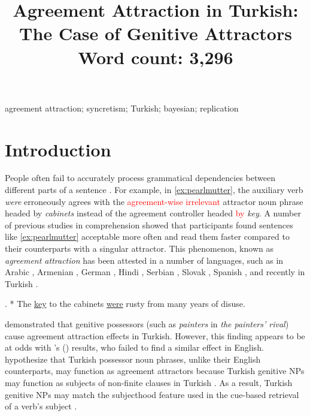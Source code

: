 \documentclass[apacite,linguex]{glossa}\usepackage[]{graphicx}\usepackage[]{color}
\title[Agreement Attraction in Turkish]{Agreement Attraction in Turkish: The Case of Genitive Attractors\\ \bigskip \large Word count: 3,296}
\author[\firstauthor \& \secondauthor]%
{%
  \spauthor{\texttt{Hidden Hidden (\firstauthor)}\\ 
  \institute{\texttt{Hidden University}}\\
  \small{
    \texttt{hidden@hidden.edu}}
  }
  \AND
  \spauthor{\texttt{Hidden Hidden (\secondauthor)}\\ 
  \institute{\texttt{Hidden University}}\\
  \small{
    \texttt{hidden@hidden.edu}}
  }%
}
\newcommand{\revise}[1]{\textcolor{red}{#1}}
\begin{document}
\sffamily
\maketitle


\begin{abstract}




\end{abstract}

\begin{keywords}
agreement attraction; syncretism; Turkish; bayesian; replication
\end{keywords}

\rmfamily



\section{Introduction}

People often fail to accurately process grammatical dependencies between different parts of a sentence \citep[e.g.,][]{GibsonThomas:1999,PhillipsEtAl:2011}. For example, in \ref{ex:pearlmutter}, the auxiliary verb \textit{were} erroneously agrees with the \revise{agreement-wise irrelevant} attractor noun phrase headed by \textit{cabinets} instead of the agreement controller headed \revise{by} \textit{key}. A number of previous studies in comprehension \citep{NicolEtAl:1997, PearlmutterGarnseyBock:1999, WagersEtAl:2009} showed that participants found sentences like \ref{ex:pearlmutter} acceptable more often and read them faster compared to their counterparts with a singular attractor. This phenomenon, known as \textit{agreement attraction} \citep{BockMiller:1991} has been attested in a number of languages, such as in Arabic \citep{TuckerEtAl:2015}, Armenian \citep{AvetisyanEtAl:2020}, German \citep{LagoFelser:2018}, Hindi \citep{BhatiaDillon:2020}, Serbian \citep{RisticEtAl:2016}, Slovak \citep{BadeckerKuminiak:2007}, Spanish \citep{LagoEtAl:2015}, and recently in Turkish \citep{LagoEtAl:2019}.


\ex. \label{ex:pearlmutter} * The \underline{key} to the cabinets \underline{were} rusty from many years of disuse. 


\citet{LagoEtAl:2019} demonstrated that genitive possessors (such as \textit{painters} in \textit{the painters' rival}) cause agreement attraction effects in Turkish. However, this finding appears to be at odds with \citeauthor{NicolEtAl:2016}'s (\citeyear{NicolEtAl:2016}) results, who failed to find a similar effect in English. \citet{LagoEtAl:2019} hypothesize that Turkish possessor noun phrases, unlike their English counterparts, may function as agreement attractors because Turkish genitive NPs may function as subjects of non-finite clauses in Turkish \citep{GokselKerslake:2005,Kornfilt:2011}. As a result, Turkish genitive NPs may match the subjecthood feature used in the cue-based retrieval of a verb's subject \citep{LewisVasishth:2005, WagersEtAl:2009, ArnettWagers:2017}.
\end{document}
